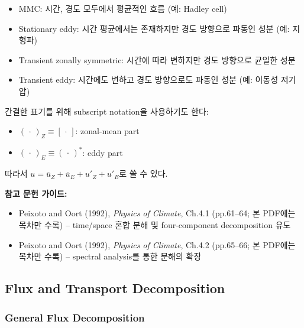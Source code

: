 \begin{hisublock}
  \begin{itemize}
    \item MMC: 시간, 경도 모두에서 평균적인 흐름 (예: Hadley cell)
    \item Stationary eddy: 시간 평균에서는 존재하지만 경도 방향으로 파동인 성분 (예: 지형파)
    \item Transient zonally symmetric: 시간에 따라 변하지만 경도 방향으로 균일한 성분
    \item Transient eddy: 시간에도 변하고 경도 방향으로도 파동인 성분 (예: 이동성 저기압)
  \end{itemize}
\end{hisublock}

\begin{remark}

  간결한 표기를 위해 subscript notation을 사용하기도 한다:
  \begin{itemize}
    \item $(\,\cdot\,)_Z \equiv [\,\cdot\,]$: zonal-mean part
    \item $(\,\cdot\,)_E \equiv (\,\cdot\,)^{*}$: eddy part
  \end{itemize}
  따라서 $u = \overline{u}_Z + \overline{u}_E + u'_Z + u'_E$로 쓸 수 있다.
\end{remark}

\begin{hisublock}
\textbf{참고 문헌 가이드:}
\begin{itemize}
  \item Peixoto and Oort (1992), \textit{Physics of Climate}, Ch.4.1 (pp.61--64; 본 PDF에는 목차만 수록) -- time/space 혼합 분해 및 four-component decomposition 유도
  \item Peixoto and Oort (1992), \textit{Physics of Climate}, Ch.4.2 (pp.65--66; 본 PDF에는 목차만 수록) -- spectral analysis를 통한 분해의 확장
\end{itemize}
\end{hisublock}

\subsection{Flux and Transport Decomposition}

\subsubsection{General Flux Decomposition}

